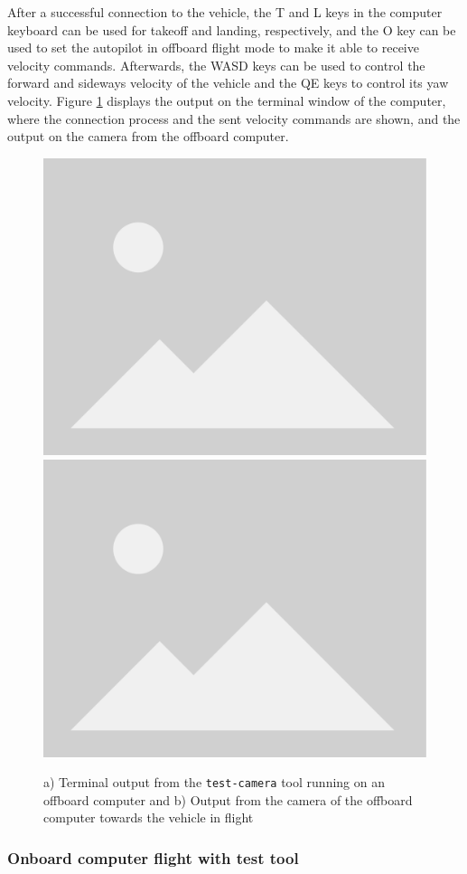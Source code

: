 After a successful connection to the vehicle, the T and L keys in the computer keyboard can be used for takeoff and landing, respectively, and the O key can be used to set the autopilot in offboard flight mode to make it able to receive velocity commands.
Afterwards, the WASD keys can be used to control the forward and sideways velocity of the vehicle and the QE keys to control its yaw velocity.
Figure \ref{fig:flight-test-cam-offboard} displays the output on the terminal window of the computer, where the connection process and the sent velocity commands are shown, and the output on the camera from the offboard computer.

\begin{figure}
  \centering
  \includegraphics[width=.45\textwidth, keepaspectratio]{img/placeholder.png}
  \includegraphics[width=.45\textwidth, keepaspectratio]{img/placeholder.png}
  \caption{a) Terminal output from the \texttt{test-camera} tool running on an offboard computer and b) Output from the camera of the offboard computer towards the vehicle in flight}
  \label{fig:flight-test-cam-offboard}
\end{figure}

\subsubsection{Onboard computer flight with test tool}
\label{subsec:fl-test-3}

